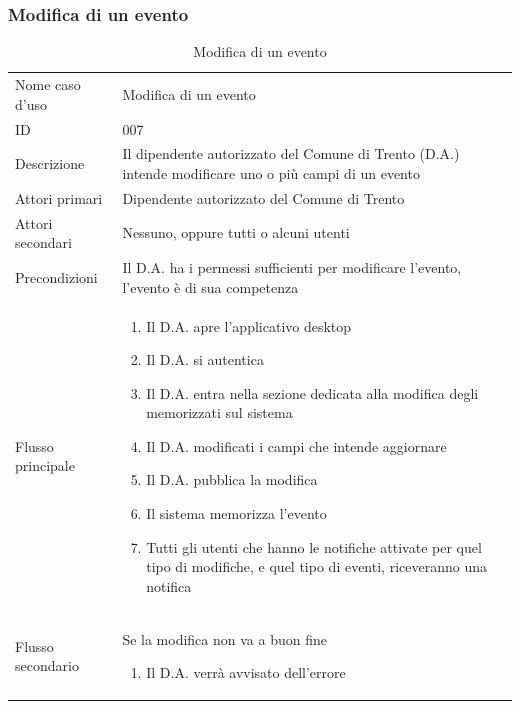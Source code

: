 \documentclass{article}
\begin{document}
\clearpage

\subsubsection{Modifica di un evento}

\begin{table}[htbp]
    \label{8.3.3}
    \centering
    \begin{tabularx}{\textwidth}{| l | p{} |}
        \Xhline{2pt} %
        Nome caso d'uso & Modifica di un evento \\
        \Xhline{2pt} %
        ID & 007 \\
        \hline
        Descrizione & Il dipendente autorizzato del Comune di Trento (D.A.) intende modificare uno o più campi di un evento\\
        \hline
        Attori primari & Dipendente autorizzato del Comune di Trento\\
        \hline
        Attori secondari & Nessuno, oppure tutti o alcuni utenti  \\
        \hline
        Precondizioni & Il D.A. ha i permessi sufficienti per modificare l'evento, l'evento è di sua competenza\\
        \hline
        Flusso principale & 
        \begin{enumerate}[topsep=5pt,partopsep=0pt,parsep=0pt,itemsep=0pt,before=\vspace{-\baselineskip},after=\vspace{-\baselineskip}]                
            \item Il D.A. apre l'applicativo desktop
            \item Il D.A. si autentica
            \item Il D.A. entra nella sezione dedicata alla modifica degli memorizzati sul sistema
            \item Il D.A. modificati i campi che intende aggiornare
            \item Il D.A. pubblica la modifica
            \item Il sistema memorizza l'evento
            \item Tutti gli utenti che hanno le notifiche attivate per quel tipo di modifiche, e quel tipo di eventi, riceveranno una notifica
        \end{enumerate}
        \\
        \hline
        Flusso secondario & 
        Se la modifica non va a buon fine
        \begin{enumerate}[topsep=10pt,partopsep=0pt,parsep=0pt,itemsep=0pt,before=\vspace{-\baselineskip},after=\vspace{-\baselineskip}]                
            \item Il D.A. verrà avvisato dell'errore
        \end{enumerate}
        \\
        \hline
    \end{tabularx}
    \caption{Modifica di un evento}
    \label{tab:tabella_use_case007}
\end{table}
\end{document}
